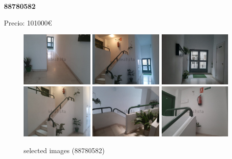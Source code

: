 \documentclass[10pt,a4paper]{report}
\begin{document}
\newpage
\begin{center}
\begin{large}
\textbf{88780582}\\[10px]
\end{large}

\end{center}
Precio: 101000€
\begin{figure}[htbp]

\includegraphics[width=0.32\textwidth]{arfima/88780582/88780582-001.jpg}
\includegraphics[width=0.32\textwidth]{arfima/88780582/88780582-002.jpg}
\includegraphics[width=0.32\textwidth]{arfima/88780582/88780582-003.jpg}
\includegraphics[width=0.32\textwidth]{arfima/88780582/88780582-004.jpg}
\includegraphics[width=0.32\textwidth]{arfima/88780582/88780582-005.jpg}
\includegraphics[width=0.32\textwidth]{arfima/88780582/88780582-006.jpg}
\caption{selected images (88780582)}
\end{figure}
\end{document}
